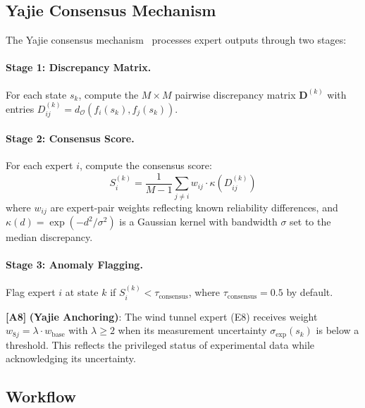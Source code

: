 \documentclass[11pt,a4paper]{article}
\theoremstyle{definition}
\theoremstyle{remark}
\newcommand{\assumptionTag}[1]{\textsf{\textbf{[A#1]}}}
\begin{document}
\subsection{Yajie Consensus Mechanism}

The Yajie consensus mechanism~\citep{scx_theory} processes expert outputs through two stages:

\paragraph{Stage 1: Discrepancy Matrix.}
For each state $s_k$, compute the $M \times M$ pairwise discrepancy matrix $\mathbf{D}^{(k)}$ with entries $D_{ij}^{(k)} = d_{\mathcal{O}}(f_i(s_k), f_j(s_k))$.

\paragraph{Stage 2: Consensus Score.}
For each expert $i$, compute the consensus score:
\begin{equation}
S_i^{(k)} = \frac{1}{M-1} \sum_{j \neq i} w_{ij} \cdot \kappa(D_{ij}^{(k)})
\label{eq:yajie_score}
\end{equation}
where $w_{ij}$ are expert-pair weights reflecting known reliability differences, and $\kappa(d) = \exp(-d^2/\sigma^2)$ is a Gaussian kernel with bandwidth $\sigma$ set to the median discrepancy.

\paragraph{Stage 3: Anomaly Flagging.}
Flag expert $i$ at state $k$ if $S_i^{(k)} < \tau_{\text{consensus}}$, where $\tau_{\text{consensus}} = 0.5$ by default.

\assumptionTag{8} \textbf{(Yajie Anchoring)}: The wind tunnel expert (E8) receives weight $w_{8j} = \lambda \cdot w_{\text{base}}$ with $\lambda \geq 2$ when its measurement uncertainty $\sigma_{\text{exp}}(s_k)$ is below a threshold.
This reflects the privileged status of experimental data while acknowledging its uncertainty.

\subsection{Workflow}
\end{document}
